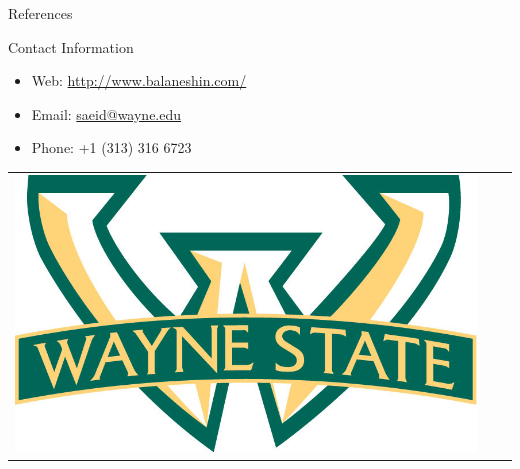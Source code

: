 \documentclass[final]{beamer}
\newlength{\onecolwid}
\begin{document}
\begin{frame}[t]
\begin{columns}[t]
\begin{column}{\onecolwid}

\begin{block}{References}

\nocite{*} %
\small{
\vspace{0.75in}}

\end{block}






\begin{alertblock}{Contact Information}

\begin{itemize}
\item Web: \href{http://www.balaneshin.com/}{http://www.balaneshin.com/}
\item Email: \href{mailto:saeid@wayne.edu}{saeid@wayne.edu}
\item Phone: +1 (313) 316 6723
\end{itemize}

\end{alertblock}

\begin{center}
\begin{tabular}{ccc}
\includegraphics[width=0.3\linewidth]{images/warrior_banded_logo.jpg} & \hfill & %
\end{tabular}
\end{center}


\end{column} %

\end{columns} %

\end{frame} %
\end{document}
